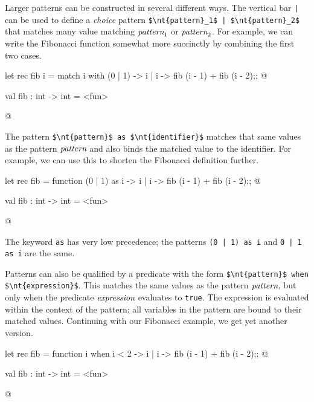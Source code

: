 Larger patterns can be constructed in several different ways.  The
vertical bar \hbox{\lstinline/|/} can be used to define a \emph{choice} pattern
\hbox{\lstinline/$\nt{pattern}_1$ | $\nt{pattern}_2$/} that matches many
value matching $\textit{\rmfamily pattern}_1$ or $\textit{\rmfamily pattern}_2$.  For
example, we can write the Fibonacci function somewhat more succinctly
by combining the first two cases.

\begin{ocaml}
let rec fib i =
   match i with
      (0 | 1) -> i
    | i -> fib (i - 1) + fib (i - 2);;
@
\begin{topoutput}
val fib : int -> int = <fun>
\end{topoutput}
@
\end{ocaml}
%
\label{keyword:as(patterns)}
The pattern
%
\hbox{\lstinline/$\nt{pattern}$ as $\nt{identifier}$/} matches that same
values as the pattern $\textit{\rmfamily pattern}$ and also binds the matched value
to the identifier.  For example, we can use this to shorten the
Fibonacci definition further.

\begin{ocaml}
let rec fib = function
   (0 | 1) as i -> i
 | i -> fib (i - 1) + fib (i - 2);;
@
\begin{topoutput}
val fib : int -> int = <fun>
\end{topoutput}
@
\end{ocaml}
%
The keyword \hbox{\lstinline/as/} has very low precedence; the patterns
\hbox{\lstinline/(0 | 1) as i/} and \hbox{\lstinline/0 | 1 as i/} are the same.

\label{keyword:when}
Patterns can also be qualified by a predicate with the form
%
\hbox{\hbox{\lstinline/$\nt{pattern}$ when $\nt{expression}$/}}.  This matches the
same values as the pattern $\textit{\rmfamily pattern}$, but only when the predicate
$\textit{\rmfamily expression}$ evaluates to \hbox{\lstinline/true/}.  The expression is
evaluated within the context of the pattern; all variables in the
pattern are bound to their matched values.  Continuing with our
Fibonacci example, we get yet another version.

\begin{ocaml}
let rec fib = function
   i when i < 2 -> i
 | i -> fib (i - 1) + fib (i - 2);;
@
\begin{topoutput}
val fib : int -> int = <fun>
\end{topoutput}
@
\end{ocaml}

